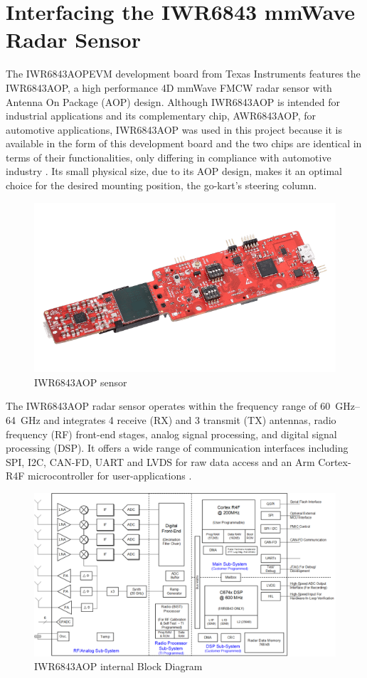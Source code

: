 \section{Interfacing the IWR6843 mmWave Radar Sensor}
\label{sec:Interfacing the mmWave radar sensor: IWR6843}
The IWR6843AOPEVM development board from Texas Instruments features the IWR6843AOP, a high performance 4D mmWave FMCW radar sensor with Antenna On Package (AOP) design.
Although IWR6843AOP is intended for industrial applications and its complementary chip, AWR6843AOP, for automotive applications, IWR6843AOP was used in this project because it is available in the form of this development board and the two chips are identical in terms of their functionalities, only differing in compliance with automotive  industry \cite{iwr_awr_diff}.
Its small physical size, due to its AOP design, makes it an optimal choice for the desired mounting position, the go-kart's steering column.
\begin{figure}[!htbp]
    \centering
    \includegraphics[width=0.7\linewidth]{images/iwr6843aopevm-angled.png}
    \caption{IWR6843AOP sensor}
    \label{fig:IWR6843AOP sensor}
\end{figure}
\par
The IWR6843AOP radar sensor operates within the frequency range of \SIrange{60}{64}{\giga\hertz} and integrates 4 receive (RX) and 3 transmit (TX) antennas, radio frequency (RF) front-end stages, analog signal processing, and digital signal processing (DSP).
It offers a wide range of communication interfaces including SPI, I2C, CAN-FD, UART and LVDS for raw data access and an Arm Cortex-R4F microcontroller for user-applications \cite{dev_board_page}.
\begin{figure}[!htbp]
    \centering
    \includegraphics[width=1.0\linewidth]{images/blockdiagram.png}
    \caption{IWR6843AOP internal Block Diagram}
    \label{fig:IWR6843AOP_internal}
\end{figure}
